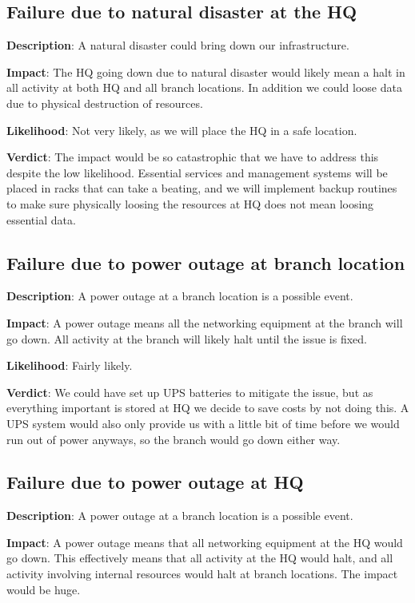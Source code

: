 \subsection{Failure due to natural disaster at the HQ}

\textbf{Description}: A natural disaster could bring down our infrastructure.

\textbf{Impact}: The HQ going down due to natural disaster would likely mean a halt in all activity at both HQ and all branch locations. In addition we could loose data due to physical destruction of resources.

\textbf{Likelihood}: Not very likely, as we will place the HQ in a safe location.

\textbf{Verdict}: The impact would be so catastrophic that we have to address this despite the low likelihood. Essential services and management systems will be placed in racks that can take a beating\cite{todo}, and we will implement backup routines to make sure physically loosing the resources at HQ does not mean loosing essential data.

\subsection{Failure due to power outage at branch location}

\textbf{Description}: A power outage at a branch location is a possible event.

\textbf{Impact}: A power outage means all the networking equipment at the branch will go down. All activity at the branch will likely halt until the issue is fixed.

\textbf{Likelihood}: Fairly likely.

\textbf{Verdict}: We could have set up UPS batteries to mitigate the issue, but as everything important is stored at HQ we decide to save costs by not doing this. A UPS system would also only provide us with a little bit of time before we would run out of power anyways, so the branch would go down either way.

\subsection{Failure due to power outage at HQ}

\textbf{Description}: A power outage at a branch location is a possible event.

\textbf{Impact}: A power outage means that all networking equipment at the HQ would go down. This effectively means that all activity at the HQ would halt, and all activity involving internal resources would halt at branch locations. The impact would be huge.

